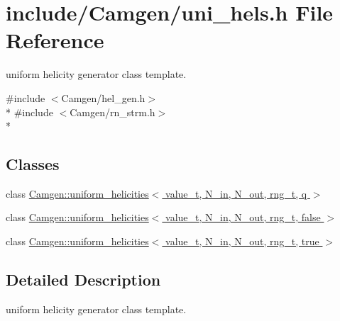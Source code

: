 \hypertarget{a00795}{\section{include/\-Camgen/uni\-\_\-hels.h File Reference}
\label{a00795}
}


uniform helicity generator class template.  


{\ttfamily \#include $<$Camgen/hel\-\_\-gen.\-h$>$}\\*
{\ttfamily \#include $<$Camgen/rn\-\_\-strm.\-h$>$}\\*
\subsection*{Classes}
\begin{DoxyCompactItemize}
\item 
class \hyperlink{a00546}{Camgen\-::uniform\-\_\-helicities$<$ value\-\_\-t, N\-\_\-in, N\-\_\-out, rng\-\_\-t, q $>$}
\item 
class \hyperlink{a00547}{Camgen\-::uniform\-\_\-helicities$<$ value\-\_\-t, N\-\_\-in, N\-\_\-out, rng\-\_\-t, false $>$}
\item 
class \hyperlink{a00548}{Camgen\-::uniform\-\_\-helicities$<$ value\-\_\-t, N\-\_\-in, N\-\_\-out, rng\-\_\-t, true $>$}
\end{DoxyCompactItemize}


\subsection{Detailed Description}
uniform helicity generator class template. 